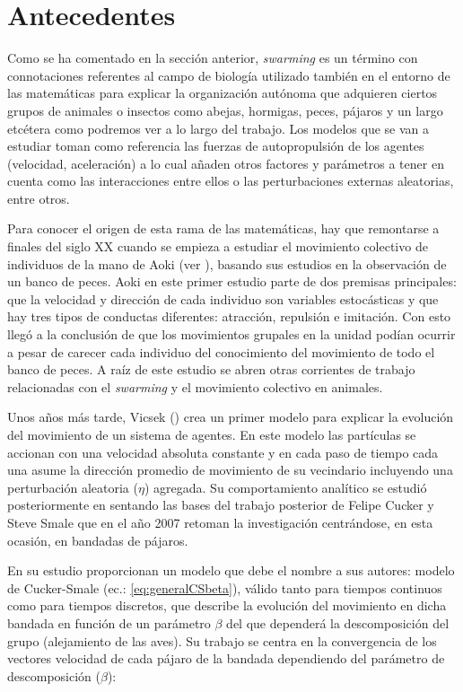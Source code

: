 \section{Antecedentes} \label{s1_2}
Como se ha comentado en la sección anterior, \textit{swarming} es un término con connotaciones referentes al campo de biología utilizado también en el entorno de las matemáticas para explicar la organización autónoma que adquieren ciertos grupos de animales o insectos como abejas, hormigas, peces, pájaros y un largo etcétera como podremos ver a lo largo del trabajo. Los modelos que se van a estudiar toman como referencia las fuerzas de autopropulsión de los agentes (velocidad, aceleración) a lo cual añaden otros factores y parámetros a tener en cuenta como las interacciones entre ellos o las perturbaciones externas aleatorias, entre otros.

Para conocer el origen de esta rama de las matemáticas, hay que remontarse a finales del siglo XX cuando se empieza a estudiar el movimiento colectivo de individuos de la mano de Aoki (ver \cite{aoki1982simulation}), basando sus estudios en la observación de un banco de peces. Aoki en este primer estudio parte de dos premisas principales: que la velocidad y dirección de cada individuo son variables estocásticas y que hay tres tipos de conductas diferentes: atracción, repulsión e imitación. Con esto llegó a la conclusión de que los movimientos grupales en la unidad podían ocurrir a pesar de carecer cada individuo del conocimiento del movimiento de todo el banco de peces. A raíz de este estudio se abren otras corrientes de trabajo relacionadas con el \textit{swarming} y el movimiento colectivo en animales. 

Unos años más tarde, Vicsek (\citeyear{vicsek1995novel}) crea un primer modelo para explicar la evolución del movimiento de un sistema de agentes. En este modelo las partículas se accionan con una velocidad absoluta constante y en cada paso de tiempo cada una asume la dirección promedio de movimiento de su vecindario incluyendo una perturbación aleatoria ($\eta$) agregada. Su comportamiento analítico se estudió posteriormente en \cite{jadbabaie2003coordination} sentando las bases del trabajo posterior de Felipe Cucker y Steve Smale \cite{cucker2007emergent} que  en el año 2007 retoman la investigación centrándose, en esta ocasión, en bandadas de pájaros.

En su estudio proporcionan un modelo que debe el nombre a sus autores: modelo de Cucker-Smale (ec.: \ref{eq:generalCSbeta}), válido tanto para tiempos continuos como para tiempos discretos, que describe la evolución del movimiento en dicha bandada en función de un parámetro $\beta$ del que dependerá la descomposición del grupo (alejamiento de las aves). Su trabajo se centra en la convergencia de los vectores velocidad de cada pájaro de la bandada dependiendo del parámetro de descomposición ($\beta$):

